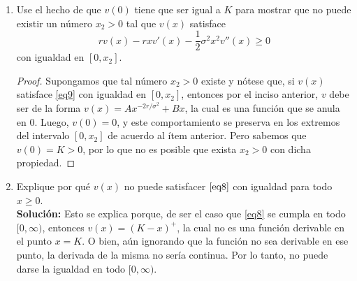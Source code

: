 \documentclass[letterpaper]{article}
\newcommand{\1}{\mathds{1}}
\theoremstyle{definition}
\theoremstyle{definition}
\theoremstyle{definition}
\theoremstyle{definition}
\theoremstyle{definition}
\begin{document}
\begin{itemize}
\begin{enumerate}
\begin{proof}
         Finalmente, suponiendo que no ocurre lo anterior y que $[x_1,x_2] \subseteq [0,K]$, entonces $(K-x)^{+}=K-x$, 
         de tal forma que la condición \eqref{eq8} con igualdad se vuelve 
         \[
            Ax^{-2r/\sigma^2}+Bx=K-x \iff Ax^{-2r/\sigma^2}=K-(B+1)x,   
         \]
         y analizando nuevamente la ecuación anterior, nos damos cuenta que, al ser $\frac{2r}{\sigma^2}$ un número positivo, 
         se tiene que una curva del tipo hipérbola está igualada a una recta con pendiente negativa y ordenada al origen $K$,
         por lo que a lo más, se podrían intersecar en dos puntos. Pero la igualdad anterior ocurre para cualquier punto 
         en $[x_1,x_2]\subseteq[0,K]$, entonces la igualdad ocurre solamente si $A=B=0$ y nuevamente $v$ es idénticamente 0. La continuidad de $v$ y su derivada $v'$' 
         nos asegura que este comportamiento se preserva en los extremos del intervalo $[x_1,x_2]$.
        \end{proof}
        \item Use el hecho de que $v(0)$ tiene que ser igual a $K$ para mostrar que no puede existir un número $x_2>0$ 
        tal que $v(x)$ satisface 
        \begin{equation}\label{eq9}
            rv(x)-rxv'(x)-\frac{1}{2}\sigma^2x^2v''(x)\geq0
        \end{equation}
        con igualdad en $[0,x_2]$.
        \begin{proof} 
          Supongamos que tal número $x_2>0$ existe y nótese que, si $v(x)$ satisface \eqref{eq9} con igualdad en $[0,x_2]$, 
          entonces por el inciso anterior, $v$ debe ser de la forma $v(x)=Ax^{-2r/\sigma^2}+Bx$, la cual 
          es una función que se anula en 0. Luego, $v(0)=0$, y este comportamiento 
          se preserva en los extremos del intervalo $[0,x_2]$ de acuerdo al ítem anterior. Pero sabemos que $v(0)=K>0$, 
          por lo que no es posible que exista $x_2>0$ con dicha propiedad.  
         \end{proof}
        \item Explique por qué $v(x)$ no puede satisfacer $\eqref{eq8}$ con igualdad para todo $x\geq0$.\\
        
         \textbf{Solución:} Esto se explica porque, de ser el caso que \eqref{eq8} se cumpla en todo $[0,\infty)$, entonces 
         $v(x)=(K-x)^{+}$, la cual no es una función derivable en el punto $x=K$. O bien, aún ignorando que 
         la función no sea derivable en ese punto, la derivada de la misma no sería continua. Por lo tanto, 
         no puede darse la igualdad en todo $[0,\infty)$. 


\end{enumerate}
\end{itemize}
\end{document}
